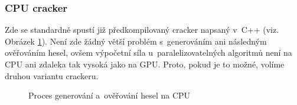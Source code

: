 \subsubsection{CPU cracker}
Zde se standardně spustí již předkompilovaný cracker napsaný v~C++ (viz. Obrázek \ref{CPU}). Není
zde žádný větší problém s~generováním ani následným ověřováním hesel, ovšem výpočetní síla
u~paralelizovatelných algoritmů není na CPU ani zdaleka tak vysoká jako na GPU. Proto, pokud je to
možné, volíme druhou variantu crackeru.
\begin{figure}[ht]
    \begin{center}
    \end{center}
    \caption{Proces generování a~ověřování hesel na CPU \cite{Schmied}}
    \label{CPU}
\end{figure}


